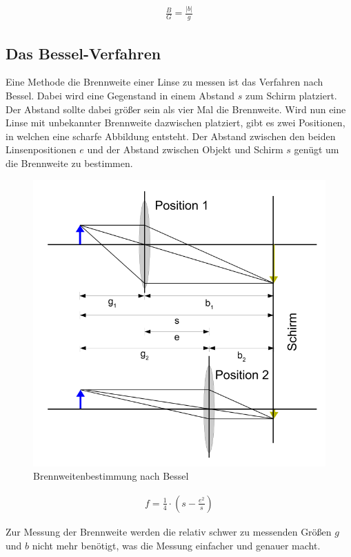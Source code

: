 \documentclass[a4paper]{scrartcl}
\numberwithin{equation}{subsection}
\begin{document}
\begin{align}
\frac{B}{G} = \frac{\vert b \vert}{g}
\end{align}

\subsection{Das Bessel-Verfahren}

Eine Methode die Brennweite einer Linse zu messen ist das Verfahren nach Bessel. Dabei wird eine Gegenstand in einem Abstand $s$ zum Schirm platziert. Der Abstand sollte dabei größer sein als vier Mal die Brennweite. Wird nun eine Linse mit unbekannter Brennweite dazwischen platziert, gibt es zwei Positionen, in welchen eine scharfe Abbildung entsteht.
Der Abstand zwischen den beiden Linsenpositionen $e$ und der Abstand zwischen Objekt und Schirm $s$ genügt um die Brennweite zu bestimmen. \cite{anl}

\begin{figure}[H]
\includegraphics[width=12cm]{Abbildungen/bessel_brennweitenbestimmung}
\centering
\caption{Brennweitenbestimmung nach Bessel\cite{anl}}
\centering
\label{fig:bessel_brennweitenbestimmung}
\end{figure}

\begin{align}
f = \frac{1}{4} \cdot \left( s - \frac{e^2}{s} \right)
\end{align}

Zur Messung der Brennweite werden die relativ schwer zu messenden Größen $g$ und $b$ nicht mehr benötigt, was die Messung einfacher und genauer macht.
\end{document}
